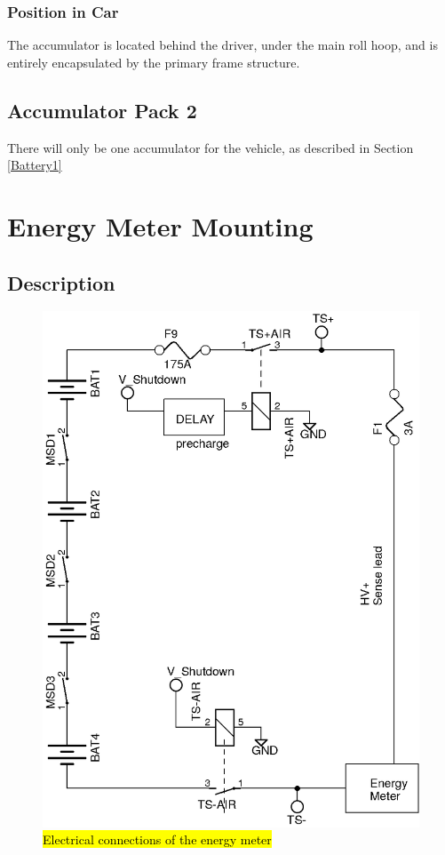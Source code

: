 \documentclass{article}
\DeclareRobustCommand{\hlr}[1]{{\sethlcolor{red}\hl{#1}}}
\begin{document}
        \subsubsection{Position in Car}

        The accumulator is located behind the driver, under the main roll hoop, and is entirely encapsulated by the primary frame structure.

    \subsection{Accumulator Pack 2}
        There will only be one accumulator for the vehicle, as described in Section \ref{Battery1}

\newpage



\section{Energy Meter Mounting} \label{energy meter}

    \subsection{Description}


        \begin{figure}[H]
            \centering
            \includegraphics[width = 0.5 \textwidth]{EnergyMeter}
            \caption{\hlr{Electrical connections of the energy meter}}
            \label{EMschem}
        \end{figure}
\end{document}
